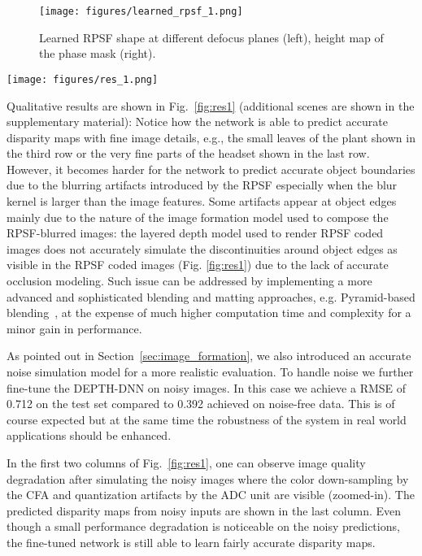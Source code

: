 \documentclass[preprint,5p,twocolumn]{elsarticle}
\begin{document}
\begin{figure}[h!]
\centering
\texttt{[image: figures/learned\_rpsf\_1.png]}
\caption{Learned RPSF shape at different defocus planes (left),  height map of the phase mask (right).}
\label{fig:learndedrpsf1}
\end{figure}

\begin{figure*}[h!]
\centering
\captionsetup{justification=centering}
\texttt{[image: figures/res\_1.png]}
\caption{Qualitative results on RPSF-blurred images from the test set of FlyingThings3D~\cite{MIFDB16} subset.}
\label{fig:res1}
\end{figure*}

Qualitative results are shown in Fig.~\ref{fig:res1} (additional scenes are shown in the supplementary material): Notice how the network is able to predict accurate disparity maps with fine image details, e.g., the small leaves of the plant shown in the third row or the very fine parts of the headset shown in the last row. However, it becomes harder for the network to predict accurate object boundaries due to the blurring artifacts introduced by the RPSF especially when the blur kernel is larger than the image features. Some artifacts appear at object edges mainly due to the nature of the image formation model used to compose the RPSF-blurred images: the layered depth model used to render RPSF coded images does not accurately simulate the discontinuities around object edges as visible in the RPSF coded images (Fig. \ref{fig:res1}) due to the lack of accurate occlusion modeling. Such issue can be addressed by implementing a more advanced and sophisticated blending and matting approaches, e.g. Pyramid-based blending~\cite{kraus2007depth}, at the expense of much higher computation time and complexity for a minor gain in performance.


As pointed out in Section~\ref{sec:image_formation}, we also introduced an accurate noise simulation model for  a more realistic evaluation. To handle noise we further fine-tune the DEPTH-DNN on noisy images. In this case we achieve a RMSE of 0.712 on the test set compared to 0.392 achieved on noise-free data. This is of course expected but at the same time the robustness of the system in real world applications should be enhanced.





In the first two columns of Fig.~\ref{fig:res1}, one can observe image quality degradation after simulating the noisy images where the color down-sampling by the CFA and quantization artifacts by the ADC unit are visible (zoomed-in). The predicted disparity maps from noisy inputs are shown in the last column. Even though a small performance degradation is noticeable on the noisy predictions, the fine-tuned network is still able to learn fairly accurate disparity maps. 
\end{document}
